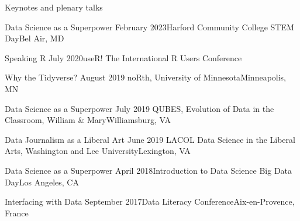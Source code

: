 \documentclass{resume} %
\begin{document}
\begin{rSection}{Keynotes and plenary talks}

\begin{sSubsection}{Data Science as a Superpower}{ }{February 2023}{Harford Community College STEM Day}{Bel Air, MD}
\end{sSubsection}

\begin{sSubsection}{Speaking R}{ }{July 2020}{useR! The International R Users Conference}{}
\end{sSubsection}

\begin{sSubsection}{Why the Tidyverse?}{ }{August 2019}{ noRth, University of Minnesota}{Minneapolis, MN}
\end{sSubsection}

\begin{sSubsection}{Data Science as a Superpower}{ }{July 2019}{ QUBES, Evolution of Data in the Classroom, William \& Mary}{Williamsburg, VA}
\end{sSubsection}

\begin{sSubsection}{Data Journalism as a Liberal Art}{ }{June 2019}{ LACOL Data Science in the Liberal Arts, Washington and Lee University}{Lexington, VA}
\end{sSubsection}

\begin{sSubsection}{Data Science as a Superpower}{ }{April 2018}{Introduction to Data Science Big Data Day}{Los Angeles, CA}
\end{sSubsection}

\begin{sSubsection}{Interfacing with Data}{ }{September 2017}{Data Literacy Conference}{Aix-en-Provence, France}
\end{sSubsection}

\end{rSection}
\end{document}
